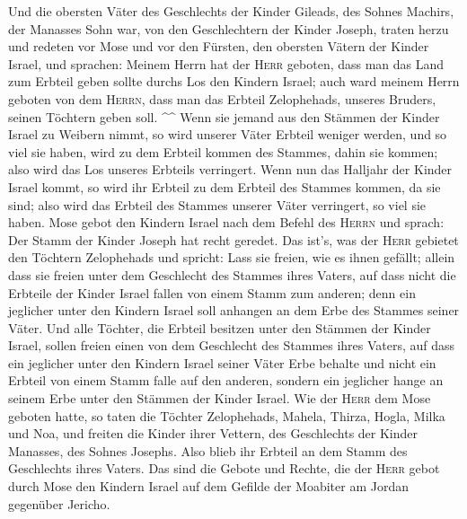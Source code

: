  Und die obersten Väter des Geschlechts der Kinder
Gileads, des Sohnes Machirs, der Manasses Sohn war, von den
Geschlechtern der Kinder Joseph, traten herzu und redeten vor Mose und
vor den Fürsten, den obersten Vätern der Kinder Israel, 
und sprachen: Meinem Herrn hat der \textsc{Herr} geboten, dass man das
Land zum Erbteil geben sollte durchs Los den Kindern Israel; auch ward
meinem Herrn geboten von dem \textsc{Herrn}, dass man das Erbteil
Zelophehads, unseres Bruders, seinen Töchtern geben soll. \^{}\^{}
 Wenn sie jemand aus den Stämmen der Kinder Israel zu
Weibern nimmt, so wird unserer Väter Erbteil weniger werden, und so viel
sie haben, wird zu dem Erbteil kommen des Stammes, dahin sie kommen;
also wird das Los unseres Erbteils verringert.  Wenn nun
das Halljahr der Kinder Israel kommt, so wird ihr Erbteil zu dem Erbteil
des Stammes kommen, da sie sind; also wird das Erbteil des Stammes
unserer Väter verringert, so viel sie haben.  Mose gebot
den Kindern Israel nach dem Befehl des \textsc{Herrn} und sprach: Der
Stamm der Kinder Joseph hat recht geredet.  Das ist's, was
der \textsc{Herr} gebietet den Töchtern Zelophehads und spricht: Lass
sie freien, wie es ihnen gefällt; allein dass sie freien unter dem
Geschlecht des Stammes ihres Vaters,  auf dass nicht die
Erbteile der Kinder Israel fallen von einem Stamm zum anderen; denn ein
jeglicher unter den Kindern Israel soll anhangen an dem Erbe des Stammes
seiner Väter.  Und alle Töchter, die Erbteil besitzen
unter den Stämmen der Kinder Israel, sollen freien einen von dem
Geschlecht des Stammes ihres Vaters, auf dass ein jeglicher unter den
Kindern Israel seiner Väter Erbe behalte  und nicht ein
Erbteil von einem Stamm falle auf den anderen, sondern ein jeglicher
hange an seinem Erbe unter den Stämmen der Kinder Israel.
 Wie der \textsc{Herr} dem Mose geboten hatte, so taten
die Töchter Zelophehads,  Mahela, Thirza, Hogla, Milka
und Noa, und freiten die Kinder ihrer Vettern,  des
Geschlechts der Kinder Manasses, des Sohnes Josephs. Also blieb ihr
Erbteil an dem Stamm des Geschlechts ihres Vaters.  Das
sind die Gebote und Rechte, die der \textsc{Herr} gebot durch Mose den
Kindern Israel auf dem Gefilde der Moabiter am Jordan gegenüber Jericho.
